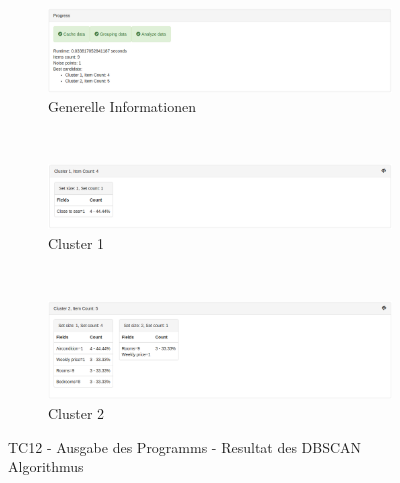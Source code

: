 \begin{figure}[H]
	\begin{subfigure}[t]{1\textwidth}
		\centering
		\includegraphics[width=1\textwidth]{images/tc12-dbscan-1}
		\caption{Generelle Informationen}
		\label{fig:testingfazit:testing:testcases:12-1-1}
	\end{subfigure} \\
	\begin{subfigure}[t]{1\textwidth}
		\centering
		\includegraphics[width=1\textwidth]{images/tc12-dbscan-2}
		\caption{Cluster 1}
		\label{fig:testingfazit:testing:testcases:12-1-2}
	\end{subfigure}\\
	\begin{subfigure}[t]{1\textwidth}
		\centering
		\includegraphics[width=1\textwidth]{images/tc12-dbscan-3}
		\caption{Cluster 2}
		\label{fig:testingfazit:testing:testcases:12-1-3}
	\end{subfigure}
	\caption{TC12 - Ausgabe des Programms - Resultat des DBSCAN Algorithmus}
	\label{fig:testingfazit:testing:testcases:12-1}
\end{figure}

